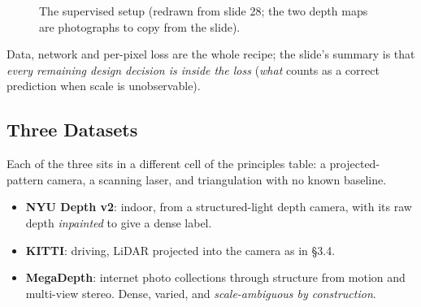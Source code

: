 \documentclass[11pt,a4paper]{article}
\theoremstyle{definition}
\theoremstyle{plain}
\theoremstyle{remark}
\begin{document}
\begin{figure}[htbp]
\centering
{}
\caption{The supervised setup (redrawn from slide 28; the two depth maps are photographs to copy from the slide).}
\end{figure}
 
\begin{intuition}
Data, network and per-pixel loss are the whole recipe; the slide's summary is that \emph{every remaining design decision is inside the loss} (\emph{what} counts as a correct prediction when scale is unobservable).
\end{intuition}
 
\subsection{Three Datasets }
 
Each of the three sits in a different cell of the principles table: a projected-pattern camera, a scanning laser, and triangulation with no known baseline.
 
\begin{itemize}
\item \textbf{NYU Depth v2}: indoor, from a structured-light depth camera, with its raw depth \emph{inpainted} to give a dense label.
\item \textbf{KITTI}: driving, LiDAR projected into the camera as in \S3.4.
\item \textbf{MegaDepth}: internet photo collections through structure from motion and multi-view stereo. Dense, varied, and \emph{scale-ambiguous by construction}.
\end{itemize}
 
\end{document}
